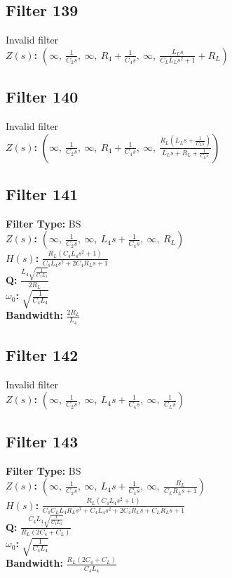 \documentclass{article}
\begin{document}
\subsection*{Filter 139}
Invalid filter \\ 
\textbf{$Z(s)$:} $\left( \infty, \  \frac{1}{C_{2} s}, \  \infty, \  R_{4} + \frac{1}{C_{4} s}, \  \infty, \  \frac{L_{L} s}{C_{L} L_{L} s^{2} + 1} + R_{L}\right)$ \\ 
\subsection*{Filter 140}
Invalid filter \\ 
\textbf{$Z(s)$:} $\left( \infty, \  \frac{1}{C_{2} s}, \  \infty, \  R_{4} + \frac{1}{C_{4} s}, \  \infty, \  \frac{R_{L} \left(L_{L} s + \frac{1}{C_{L} s}\right)}{L_{L} s + R_{L} + \frac{1}{C_{L} s}}\right)$ \\ 
\subsection*{Filter 141}
\textbf{Filter Type:} BS \\ 
\textbf{$Z(s)$:} $\left( \infty, \  \frac{1}{C_{2} s}, \  \infty, \  L_{4} s + \frac{1}{C_{4} s}, \  \infty, \  R_{L}\right)$ \\ 
\textbf{$H(s)$:} $\frac{R_{L} \left(C_{4} L_{4} s^{2} + 1\right)}{C_{4} L_{4} s^{2} + 2 C_{4} R_{L} s + 1}$ \\ 
\textbf{Q:} $\frac{L_{4} \sqrt{\frac{1}{C_{4} L_{4}}}}{2 R_{L}}$ \\ 
\textbf{$\omega_0$:} $\sqrt{\frac{1}{C_{4} L_{4}}}$ \\ 
\textbf{Bandwidth:} $\frac{2 R_{L}}{L_{4}}$ \\ 
\subsection*{Filter 142}
Invalid filter \\ 
\textbf{$Z(s)$:} $\left( \infty, \  \frac{1}{C_{2} s}, \  \infty, \  L_{4} s + \frac{1}{C_{4} s}, \  \infty, \  \frac{1}{C_{L} s}\right)$ \\ 
\subsection*{Filter 143}
\textbf{Filter Type:} BS \\ 
\textbf{$Z(s)$:} $\left( \infty, \  \frac{1}{C_{2} s}, \  \infty, \  L_{4} s + \frac{1}{C_{4} s}, \  \infty, \  \frac{R_{L}}{C_{L} R_{L} s + 1}\right)$ \\ 
\textbf{$H(s)$:} $\frac{R_{L} \left(C_{4} L_{4} s^{2} + 1\right)}{C_{4} C_{L} L_{4} R_{L} s^{3} + C_{4} L_{4} s^{2} + 2 C_{4} R_{L} s + C_{L} R_{L} s + 1}$ \\ 
\textbf{Q:} $\frac{C_{4} L_{4} \sqrt{\frac{1}{C_{4} L_{4}}}}{R_{L} \left(2 C_{4} + C_{L}\right)}$ \\ 
\textbf{$\omega_0$:} $\sqrt{\frac{1}{C_{4} L_{4}}}$ \\ 
\textbf{Bandwidth:} $\frac{R_{L} \left(2 C_{4} + C_{L}\right)}{C_{4} L_{4}}$ \\ 
\end{document}
